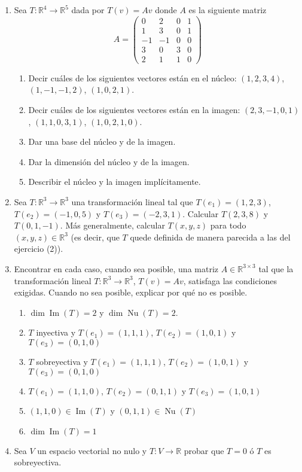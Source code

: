 \documentclass[12pt]{amsart}
\begin{document}
\begin{enumerate}[resume, topsep=5pt,itemsep=5pt]
\item Sea $T: \mathbb{R}^4 \to \mathbb{R}^5$ dada por $T(v) = Av$ donde $A$ es la siguiente matriz
	$$
	A=\left(\begin{matrix}
	0& 2& 0&1\\   1& 3& 0&1\\  -1&-1&0&0\\3&0&3&0\\2&1&1&0 \end{matrix}
	\right)
	$$
	\begin{enumerate}[topsep=5pt,itemsep=5pt]
		\item Decir cu\'ales de los siguientes vectores est\'an en el n\'ucleo:
		$(1,2,3,4)$, $(1,-1,-1,2)$, $(1,0,2,1)$.
		\item Decir cu\'ales de los siguientes vectores est\'an en la imagen:
		$(2,3,-1,0,1)$, $(1,1,0,3,1)$, $(1,0,2,1,0)$.
		\item Dar una base del n\'ucleo y de la imagen. 
		\item Dar la dimensi\'on del n\'ucleo y de la imagen.
		\item Describir el n\'ucleo y la imagen impl\'icitamente.
	\end{enumerate}
	
	
    \item Sea $T:\mathbb{R}^3\longrightarrow\mathbb{R}^3$ una transformaci\'on lineal tal que $T(e_1)=(1,2,3)$, $T(e_2)=(-1,0,5)$ y $T(e_3)=(-2,3,1)$. Calcular $T(2,3,8)$ y $T(0,1,-1)$. M\'as generalmente, calcular $T(x,y,z)$ para todo $(x,y,z)\in\mathbb{R}^3$ (es decir, que $T$ quede definida de manera parecida a las del ejercicio (2)). 
    
	\item Encontrar en cada caso, cuando sea posible, una matriz $A\in\mathbb{R}^{3\times 3}$ tal que la transformaci\'on lineal $T:\mathbb{R}^3\longrightarrow\mathbb{R}^3$, $T(v)=Av$, satisfaga las condiciones exigidas.
	Cuando no sea posible, explicar por qu\'e no es posible.
	\begin{enumerate}[ topsep=5pt,itemsep=5pt]
		\item $\operatorname{dim} \operatorname{Im}(T)=2$ y $\operatorname{dim}\operatorname{Nu}(T)=2$.
		\item $T$ inyectiva y $T(e_1)=(1,1,1)$, $T(e_2)=(1,0,1)$ y $T(e_3)=(0,1,0)$
		\item $T$ sobreyectiva y $T(e_1)=(1,1,1)$, $T(e_2)=(1,0,1)$ y $T(e_3)=(0,1,0)$
		\item $T(e_1)=(1,1,0)$, $T(e_2)=(0,1,1)$ y $T(e_3)=(1,0,1)$
		\item $(1,1,0)\in\operatorname{Im}(T)$ y $(0,1,1)\in\operatorname{Nu}(T)$  
		\item $\operatorname{dim} \operatorname{Im}(T)=1$
	\end{enumerate}
   \item Sea $V$ un espacio vectorial no nulo y $T:V\longrightarrow\mathbb{R}$ probar que $T=0$ \'o $T$ es sobreyectiva.
   
      
\end{enumerate}
\end{document}
